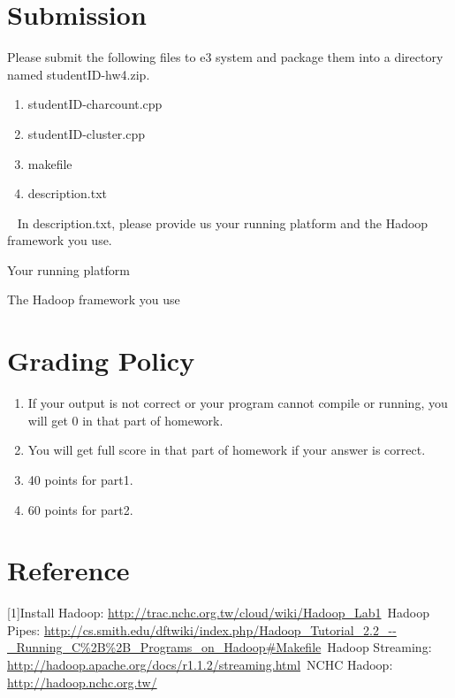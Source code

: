 \documentclass[a4paper,10pt]{article}
\begin{document}
\section{Submission}
Please submit the following files to e3 system and package them into a directory named studentID-hw4.zip.
\begin{enumerate}
\item studentID-charcount.cpp
\item studentID-cluster.cpp
\item makefile
\item description.txt
\end{enumerate}
~\newline
In description.txt, please provide us your running platform and the Hadoop framework you use.
\item Your running platform
\item The Hadoop framework you use

\section{Grading Policy}
\begin{enumerate}
\item If your output is not correct or your program cannot compile or running, you will get 0 in that part of homework.
\item You will get full score in that part of homework if your answer is correct.
\item 40 points for part1.
\item 60 points for part2.
\end{enumerate}

\section{Reference}
[1]Install Hadoop: \url{http://trac.nchc.org.tw/cloud/wiki/Hadoop_Lab1}~\newline
[2]Hadoop Pipes: \url{http://cs.smith.edu/dftwiki/index.php/Hadoop_Tutorial_2.2_--_Running_C%2B%2B_Programs_on_Hadoop#Makefile}~\newline
[3]Hadoop Streaming: \url{http://hadoop.apache.org/docs/r1.1.2/streaming.html}~\newline
[4]NCHC Hadoop: \url{http://hadoop.nchc.org.tw/}
\end{document}
